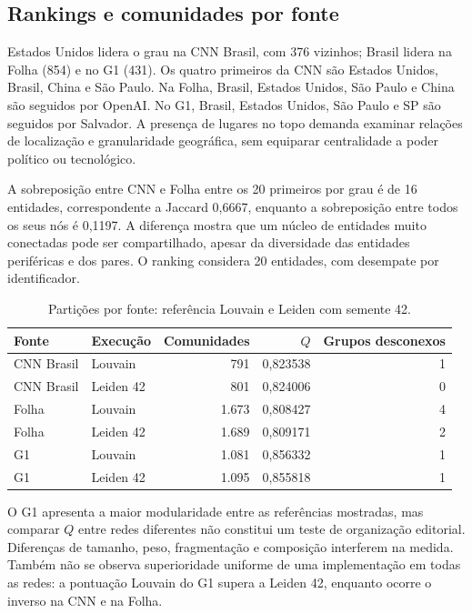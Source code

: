 \documentclass[11pt,a4paper]{article}
\begin{document}
\clearpage
\subsection{Rankings e comunidades por fonte}
Estados Unidos lidera o grau na CNN Brasil, com 376 vizinhos; Brasil lidera na Folha (854) e no G1 (431). Os quatro primeiros da CNN são Estados Unidos, Brasil, China e São Paulo. Na Folha, Brasil, Estados Unidos, São Paulo e China são seguidos por OpenAI. No G1, Brasil, Estados Unidos, São Paulo e SP são seguidos por Salvador. A presença de lugares no topo demanda examinar relações de localização e granularidade geográfica, sem equiparar centralidade a poder político ou tecnológico.

A sobreposição entre CNN e Folha entre os 20 primeiros por grau é de 16 entidades, correspondente a Jaccard 0,6667, enquanto a sobreposição entre todos os seus nós é 0,1197. A diferença mostra que um núcleo de entidades muito conectadas pode ser compartilhado, apesar da diversidade das entidades periféricas e dos pares. O ranking considera 20 entidades, com desempate por identificador.

\begin{table}[H]\centering\small
\caption{Partições por fonte: referência Louvain e Leiden com semente 42.}\label{tab:fontescom}
\begin{tabular}{llrrr}\toprule
Fonte & Execução & Comunidades & $Q$ & Grupos desconexos\\\midrule
CNN Brasil & Louvain & 791 & 0,823538 & 1\\
CNN Brasil & Leiden 42 & 801 & 0,824006 & 0\\
Folha & Louvain & 1.673 & 0,808427 & 4\\
Folha & Leiden 42 & 1.689 & 0,809171 & 2\\
G1 & Louvain & 1.081 & 0,856332 & 1\\
G1 & Leiden 42 & 1.095 & 0,855818 & 1\\\bottomrule
\end{tabular}
\end{table}

O G1 apresenta a maior modularidade entre as referências mostradas, mas comparar $Q$ entre redes diferentes não constitui um teste de organização editorial. Diferenças de tamanho, peso, fragmentação e composição interferem na medida. Também não se observa superioridade uniforme de uma implementação em todas as redes: a pontuação Louvain do G1 supera a Leiden 42, enquanto ocorre o inverso na CNN e na Folha.
\end{document}
